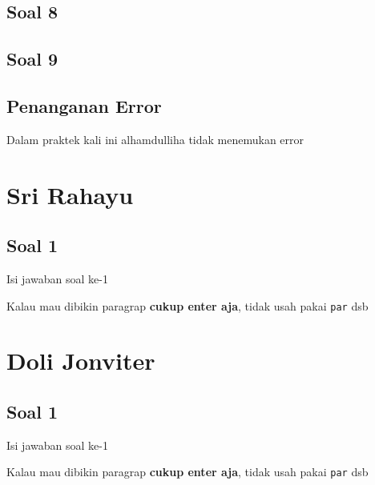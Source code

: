 \subsection{Soal 8}


\subsection{Soal 9}


\subsection{Penanganan Error}
Dalam praktek kali ini alhamdulliha tidak menemukan error

\section{Sri Rahayu}
\subsection{Soal 1}
Isi jawaban soal ke-1

Kalau mau dibikin paragrap \textbf{cukup enter aja}, tidak usah pakai \verb|par| dsb



\section{Doli Jonviter}
\subsection{Soal 1}
Isi jawaban soal ke-1

Kalau mau dibikin paragrap \textbf{cukup enter aja}, tidak usah pakai \verb|par| dsb


